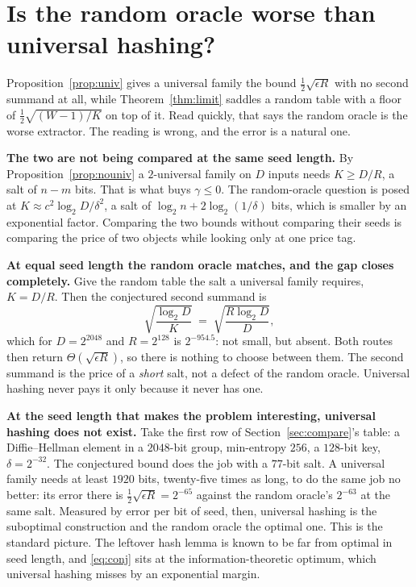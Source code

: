 \documentclass{aicr-solution}
\begin{document}
\section{Is the random oracle worse than universal hashing?}\label{sec:vs}

Proposition~\ref{prop:univ} gives a universal family the bound $\tfrac12\sqrt{\epsilon R}$ with no
second summand at all, while Theorem~\ref{thm:limit} saddles a random table with a floor of
$\tfrac12\sqrt{(W-1)/K}$ on top of it. Read quickly, that says the random oracle is the worse
extractor. The reading is wrong, and the error is a natural one.

\medskip
\noindent\textbf{The two are not being compared at the same seed length.} By
Proposition~\ref{prop:nouniv} a $2$-universal family on $D$ inputs needs $K \ge D/R$, a salt of
$n - m$ bits. That is what buys $\gamma \le 0$. The random-oracle question is posed at
$K \approx c^{2}\log_2 D/\delta^{2}$, a salt of $\log_2 n + 2\log_2(1/\delta)$ bits, which is
smaller by an exponential factor. Comparing the two bounds without comparing their seeds is
comparing the price of two objects while looking only at one price tag.

\medskip
\noindent\textbf{At equal seed length the random oracle matches, and the gap closes completely.}
Give the random table the salt a universal family requires, $K = D/R$. Then the conjectured second
summand is
\[
  \sqrt{\frac{\log_2 D}{K}} \;=\; \sqrt{\frac{R\log_2 D}{D}} ,
\]
which for $D = 2^{2048}$ and $R = 2^{128}$ is $2^{-954.5}$: not small, but absent. Both routes then
return $\Theta(\sqrt{\epsilon R})$, so there is nothing to choose between them. The second summand
is the price of a \emph{short} salt, not a defect of the random oracle. Universal hashing never
pays it only because it never has one.

\medskip
\noindent\textbf{At the seed length that makes the problem interesting, universal hashing does not
exist.} Take the first row of Section~\ref{sec:compare}'s table: a Diffie--Hellman element in a
$2048$-bit group, min-entropy $256$, a $128$-bit key, $\delta = 2^{-32}$. The conjectured bound
does the job with a $77$-bit salt. A universal family needs at least $1920$ bits, twenty-five times
as long, to do the same job no better: its error there is $\tfrac12\sqrt{\epsilon R} = 2^{-65}$
against the random oracle's $2^{-63}$ at the same salt. Measured by error per bit of seed, then,
universal hashing is the suboptimal construction and the random oracle the optimal one. This is
the standard picture. The leftover hash lemma is known to be far from optimal in seed length, and
\eqref{eq:conj} sits at the information-theoretic optimum, which universal hashing misses by an
exponential margin.
\end{document}
